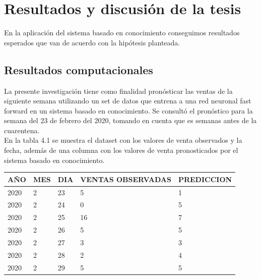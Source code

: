 \chapter{Resultados y discusión de la tesis}

En la aplicación del sistema basado en conocimiento conseguimos resultados esperados que van de acuerdo con la hipótesis planteada.


\section{Resultados computacionales}

La presente investigación tiene como finalidad pronósticar las ventas de la siguiente semana utilizando un set de datos que entrena a una red neuronal fast forward en un sistema basado en conocimiento. Se consultó el pronóstico para la semana del 23 de febrero del 2020, tomando en cuenta que es semanas antes de la cuarentena.\\
En la tabla 4.1 se muestra el dataset con los valores de venta observados y la fecha, además de una columna con los valores de venta pronosticados por el sistema basado en conocimiento.\\


\begin{table}[h!]
\centering
\begin{tabular}{|l|l|l|l|l|} 
\hline
\textbf{AÑO} & \textbf{MES} & \textbf{DIA} & \textbf{VENTAS OBSERVADAS} & \textbf{PREDICCION}  \\ 
\hline
2020         & 2            & 23           & 5                          & 1                    \\ 
\hline
2020         & 2            & 24           & 0                          & 5                    \\ 
\hline
2020         & 2            & 25           & 16                         & 7                    \\ 
\hline
2020         & 2            & 26           & 5                          & 5                    \\ 
\hline
2020         & 2            & 27           & 3                          & 3                    \\ 
\hline
2020         & 2            & 28           & 2                          & 4                    \\ 
\hline
2020         & 2            & 29           & 5                          & 5                    \\
\hline
\end{tabular}
\end{table}


